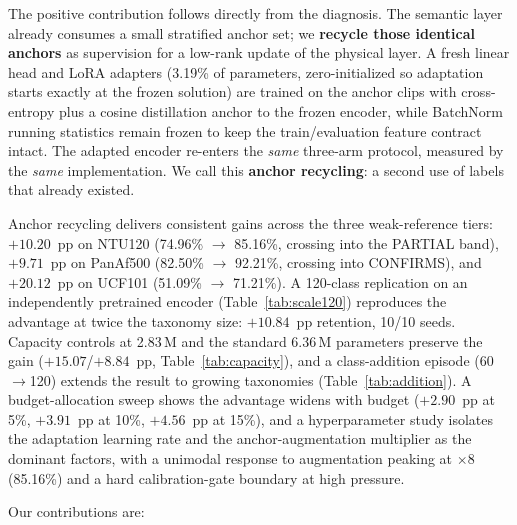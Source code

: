 \documentclass[preprint,12pt,number]{elsarticle}
\begin{document}
The positive contribution follows directly from the diagnosis. The semantic
layer already consumes a small stratified anchor set; we \textbf{recycle those
identical anchors} as supervision for a low-rank update of the physical
layer. A fresh linear head and LoRA adapters (3.19\% of parameters,
zero-initialized so adaptation starts exactly at the frozen solution) are
trained on the anchor clips with cross-entropy plus a cosine distillation
anchor to the frozen encoder, while BatchNorm running statistics remain
frozen to keep the train/evaluation feature contract intact. The adapted
encoder re-enters the \emph{same} three-arm protocol, measured by the \emph{same}
implementation. We call this \textbf{anchor recycling}: a second use of labels
that already existed.

Anchor recycling delivers consistent gains across the three weak-reference
tiers: $+10.20$~pp on NTU120 (74.96\% $\rightarrow$ 85.16\%, crossing into the PARTIAL
band), $+9.71$~pp on PanAf500 (82.50\% $\rightarrow$ 92.21\%, crossing into CONFIRMS), and
$+20.12$~pp on UCF101 (51.09\% $\rightarrow$ 71.21\%). A 120-class replication on an
independently pretrained encoder (Table~\ref{tab:scale120}) reproduces the
advantage at twice the taxonomy size: $+10.84$~pp retention, 10/10 seeds.
Capacity controls at 2.83\,M and the standard 6.36\,M parameters preserve the
gain ($+15.07$/$+8.84$~pp, Table~\ref{tab:capacity}), and a class-addition
episode (60$\rightarrow$120) extends the result to growing taxonomies
(Table~\ref{tab:addition}). A
budget-allocation sweep shows the
advantage widens with budget ($+2.90$~pp at 5\%, $+3.91$~pp at 10\%, $+4.56$~pp at 15\%),
and a hyperparameter study isolates the adaptation learning rate and the
anchor-augmentation multiplier as the dominant factors, with a unimodal
response to augmentation peaking at $\times 8$ (85.16\%) and a hard calibration-gate
boundary at high pressure.

Our contributions are:
\end{document}

